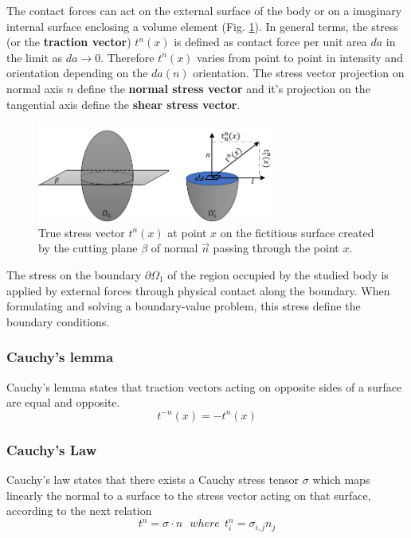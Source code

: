The contact forces can act on the external surface of the body or on a imaginary internal surface enclosing a volume element (Fig. \ref{internalcontactForceDefinition}). 
In general terms, the stress (or the \textbf{traction vector}) $t^n(x)$ is defined as contact force per unit area $da$ in the limit as $da \rightarrow 0$. Therefore $t^n(x)$ varies from point to point in intensity and orientation depending on the $da(n)$ orientation.  The stress vector projection on normal axis $n$ define the \textbf{normal stress vector} and it's projection on the tangential axis define the \textbf{shear stress vector}.


\begin{figure}
\begin{center}
\includegraphics[width=0.7\textwidth,keepaspectratio]{figures/internalcontactForceDefinition.png} 
\caption[]{True stress vector $t^n(x)$ at point $x$ on the fictitious surface created  by the cutting plane $\beta$ of normal  $\overrightarrow n$ passing through the point $x$. }
\label{internalcontactForceDefinition}
\end{center}
\end{figure}

The stress on the boundary $\partial \Omega_1$ of the region occupied by the studied body is applied by external forces through physical contact along the boundary. When formulating and solving a boundary-value problem, this stress define the boundary conditions.




\subsubsection*{Cauchy's lemma}

Cauchy's lemma states that traction vectors acting on opposite sides of a surface are equal and opposite.
\begin{equation}
t^{-n}(x) = -t^n(x)
\label{chauchyLemma}
\end{equation}
\subsubsection*{Cauchy's Law}
Cauchy’s law states that there exists a Cauchy stress tensor $\sigma$ which maps linearly the normal to a surface to the stress vector acting on that surface, according to the next relation
\begin{equation}
t^n = \sigma \cdot n \ \ \ where \  \ t^n_i = \sigma_{i,j} n_j
\end{equation}

